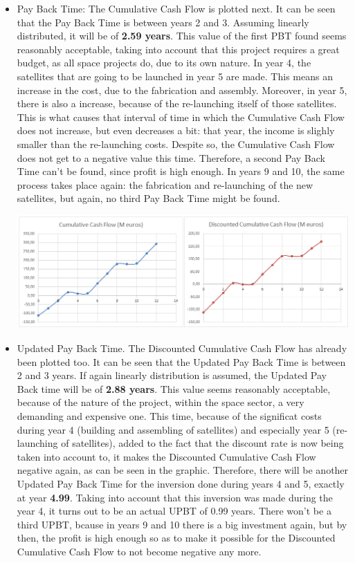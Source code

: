 \begin{itemize}
\item Pay Back Time: The Cumulative Cash Flow is plotted next. It can be seen that the Pay Back Time is between years 2 and 3. Assuming linearly distributed, it will be of \textbf{2.59 years}. This value of the first PBT found seems reasonably acceptable, taking into account that this project requires a great budget, as all space projects do, due to its own nature. In year 4, the satellites that are going to be launched in year 5 are made. This means an increase in the cost, due to the fabrication and assembly. Moreover, in year 5, there is also a increase, because of the re-launching itself of those satellites. This is what causes that interval of time in which the Cumulative Cash Flow does not increase, but even decreases a bit: that year, the income is slighly smaller than the re-launching costs. Despite so, the Cumulative Cash Flow does not get to a negative value this time. Therefore, a second Pay Back Time can't be found, since profit is high enough. In years 9 and 10, the same process takes place again: the fabrication and re-launching of the new satellites, but again, no third Pay Back Time might be found. 

\includegraphics[width=140mm]{CCFTogether.png}


\item Updated Pay Back Time. The Discounted Cumulative Cash Flow has already been plotted too. It can be seen that the Updated Pay Back Time is between 2 and 3 years. If again linearly distribution is assumed, the Updated Pay Back time will be of \textbf{2.88 years}. This value seems reasonably acceptable, because of the nature of the project, within the space sector, a very demanding and expensive one.
This time, because of the significat costs during year 4 (building and assembling of satellites) and especially year 5 (re-launching of satellites), added to the fact that the discount rate is now being taken into account to, it makes the Discounted Cumulative Cash Flow negative again, as can be seen in the graphic. Therefore, there will be another Updated Pay Back Time for the inversion done during years 4 and 5, exactly at year \textbf{4.99}. Taking into account that this inversion was made during the year 4, it turns out to be an actual UPBT of 0.99 years. There won't be a third UPBT, bcause in years 9 and 10 there is a big investment again, but by then, the profit is high enough so as to make it possible for the Discounted Cumulative Cash Flow to not become negative any more. 



\end{itemize}
